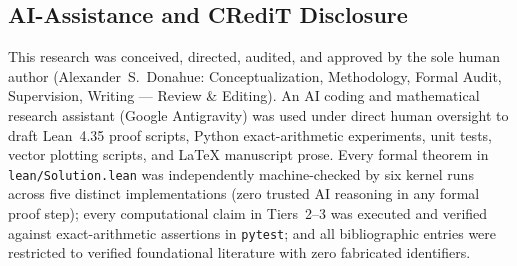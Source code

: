 \documentclass[11pt,reqno]{amsart}
\newcommand{\code}[1]{\texttt{\nolinkurl{#1}}}
\theoremstyle{definition}
\begin{document}
\subsection{AI-Assistance and CRediT Disclosure}
This research was conceived, directed, audited, and approved by the sole human author
(Alexander~S.\ Donahue: Conceptualization, Methodology, Formal Audit, Supervision, Writing
--- Review \& Editing). An AI coding and mathematical research assistant (Google
Antigravity) was used under direct human oversight to draft Lean~4.35 proof scripts,
Python exact-arithmetic experiments, unit tests, vector plotting scripts, and LaTeX
manuscript prose. Every formal theorem in \code{lean/Solution.lean} was independently
machine-checked by six kernel runs across five distinct implementations (zero trusted
AI reasoning in any formal proof step); every computational claim in Tiers~2--3 was
executed and verified against exact-arithmetic assertions in \texttt{pytest}; and all
bibliographic entries were restricted to verified foundational literature with zero
fabricated identifiers.
\end{document}

